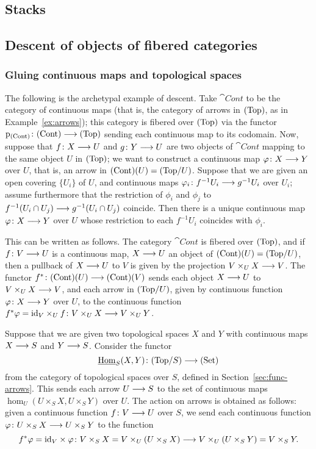 \begin{4   STACKS}
\setcounter{chapter}{3}
\chapter{Stacks}\label{ch:stacks}
\begin{4.1 Descent of objects of fibcats}
\setcounter{section}{0}
\section{Descent of objects of fibered categories}
\setcounter{theorem}{0}
\subsection{Gluing continuous maps and topological spaces}

The  following is the archetypal example of descent.
Take $\cat{Cont}$ to be the category of continuous maps (that is, the category of arrows in $(\mathrm{Top})$, as in Example~\ref{ex:arrows}); this category is fibered over $(\mathrm{Top})$ via the functor $\p_{\cat{Cont}} \colon \cat{Cont} \arr \cattop$ sending each continuous map to its codomain. Now, suppose that $f \colon X \arr U$ and $g \colon Y \arr U$ are two objects of $\cat{Cont}$ mapping to the same object $U$ in $(\mathrm{Top})$; we want to construct a continuous map $\phi\colon X \arr Y$ over $U$, that is, an arrow in $(\mathrm{Cont})(U) = ({\mathrm{Top}/U})$. Suppose that we are given an open covering $\{U_i\}$ of $U$, and continuous maps $\phi_i \colon f^{-1} U_i \arr g^{-1} U_i$ over $U_i$; assume furthermore that the restriction of $\phi_i$ and $\phi_j$ to $f ^{-1}(U_i \cap U_j) \arr g^{-1}(U_i \cap U_j)$ coincide. Then there is a unique continuous map $\phi \colon X \arr Y$ over $U$ whose restriction to each $f^{-1}U_i$ coincides with $\phi_i$.

This can be written as follows. The category $\cat{Cont}$ is fibered over $(\mathrm{Top})$, and if $f\colon V \arr U$ is a continuous map, $X \arr U$ an object of $(\mathrm{Cont}) (U) = ({\mathrm{Top}/U})$, then a pullback of $X \arr U$ to $V$ is given by the projection $V \times_U X \arr V$. The functor $f^* \colon \cat{Cont}(U) \arr \cat{Cont}(V)$ sends each object $X \arr U$ to $V \times_U X \arr V$, and each arrow in $({\mathrm{Top}/U})$, given by  continuous function $\phi\colon X \arr Y$ over $U$, to the continuous function $f^* \phi = \id_V \times_U f \colon V \times_U X \arr V \times_U Y$. 

Suppose that we are given two topological spaces $X$ and $Y$ with continuous maps $X \arr S$ and $Y \arr S$. Consider the functor
   \[
   \underhom_S(X, Y) \colon \catover{Top}{S} \arr \catset
   \]
from the category of topological spaces over $S$, defined in Section~\ref{sec:func-arrows}. This sends each arrow $U \arr S$ to the set of continuous maps $\hom_U(U \times_S X, U \times_S Y)$ over $U$. The action on arrows is obtained as follows: given a continuous function $f \colon V \arr U$ over $S$, we send each continuous function $\phi \colon U \times_S X \arr U \times_S Y$ to the function
   \[
   f^* \phi = \id_V \times \phi \colon V
   \times_S X = V \times_U(U \times_S X) \arr V \times_U(U
   \times_S Y) = V \times_S Y.
   \]


\end{4.1 Descent of objects of fibcats}
\end{4   STACKS}

